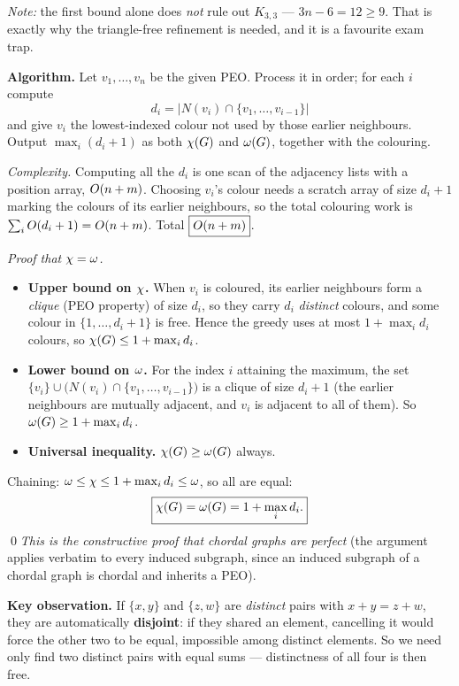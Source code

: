 \emph{Note:} the first bound alone does \emph{not} rule out $K_{3,3}$ --- $3n-6=12\ge9$. That is
exactly why the triangle-free refinement is needed, and it is a favourite exam trap.

\textbf{Algorithm.} Let $v_1,\dots,v_n$ be the given PEO. Process it in order; for each $i$
compute
\[
  d_i=\bigl|N(v_i)\cap\{v_1,\dots,v_{i-1}\}\bigr|
\]
and give $v_i$ the lowest-indexed colour not used by those earlier neighbours. Output
$\max_i(d_i+1)$ as both $\chi(G)$ and $\omega(G)$, together with the colouring.

\emph{Complexity.} Computing all the $d_i$ is one scan of the adjacency lists with a position
array, $O(n+m)$. Choosing $v_i$'s colour needs a scratch array of size $d_i+1$ marking the
colours of its earlier neighbours, so the total colouring work is $\sum_iO(d_i+1)=O(n+m)$.
Total $\boxed{O(n+m)}$.

\emph{Proof that $\chi=\omega$.}
\begin{itemize}
  \item \textbf{Upper bound on $\chi$.} When $v_i$ is coloured, its earlier neighbours form a
        \emph{clique} (PEO property) of size $d_i$, so they carry $d_i$ \emph{distinct} colours,
        and some colour in $\{1,\dots,d_i+1\}$ is free. Hence the greedy uses at most
        $1+\max_i d_i$ colours, so $\chi(G)\le1+\max_i d_i$.
  \item \textbf{Lower bound on $\omega$.} For the index $i$ attaining the maximum, the set
        $\{v_i\}\cup\bigl(N(v_i)\cap\{v_1,\dots,v_{i-1}\}\bigr)$ is a clique of size $d_i+1$
        (the earlier neighbours are mutually adjacent, and $v_i$ is adjacent to all of them). So
        $\omega(G)\ge1+\max_i d_i$.
  \item \textbf{Universal inequality.} $\chi(G)\ge\omega(G)$ always.
\end{itemize}
Chaining: $\omega\le\chi\le1+\max_i d_i\le\omega$, so all are equal:
\[
  \boxed{\chi(G)=\omega(G)=1+\max_i d_i .}
\]
\qed \emph{This is the constructive proof that chordal graphs are perfect} (the argument applies
verbatim to every induced subgraph, since an induced subgraph of a chordal graph is chordal and
inherits a PEO).

\textbf{Key observation.} If $\{x,y\}$ and $\{z,w\}$ are \emph{distinct} pairs with $x+y=z+w$,
they are automatically \textbf{disjoint}: if they shared an element, cancelling it would force
the other two to be equal, impossible among distinct elements. So we need only find two distinct
pairs with equal sums --- distinctness of all four is then free.

